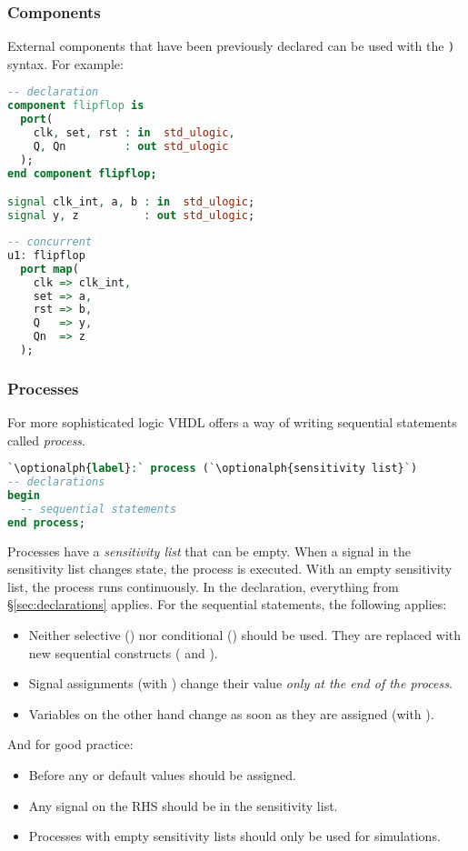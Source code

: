 \subsubsection{Components}
External components that have been previously declared can be used with the
\texttt{)} syntax. For example:
\begin{lstlisting}[language=vhdl]
-- declaration
component flipflop is
  port(
    clk, set, rst : in  std_ulogic,
    Q, Qn         : out std_ulogic 
  );
end component flipflop;

signal clk_int, a, b : in  std_ulogic;
signal y, z          : out std_ulogic;
\end{lstlisting}
\begin{lstlisting}[language=vhdl]
-- concurrent
u1: flipflop
  port map(
    clk => clk_int,
    set => a,
    rst => b,
    Q   => y,
    Qn  => z
  );

\end{lstlisting}

\subsubsection{Processes}
For more sophisticated logic VHDL offers a way of writing sequential statements
called \emph{process}.
\begin{lstlisting}[language=vhdl]
`\optionalph{label}:` process (`\optionalph{sensitivity list}`)
-- declarations
begin
  -- sequential statements
end process;
\end{lstlisting}
Processes have a \emph{sensitivity list} that can be empty.  When a signal in
the sensitivity list changes state, the process is executed.  With an empty
sensitivity list, the process runs continuously.  In the declaration,
everything from \S\ref{sec:declarations} applies. For the sequential
statements, the following applies:
\begin{itemize}
  \item Neither selective () nor conditional () should be used.
    They are replaced with new sequential constructs ( and ).
  \item Signal assignments (with \vhdl{<=}) change their value
    \emph{only at the end of the process}.
  \item Variables on the other hand change as soon as they are assigned (with \vhdl{:=}).
\end{itemize}
And for good practice:
\begin{itemize}
  \item Before any  or  default values should be assigned.
  \item Any signal on the RHS should be in the sensitivity list.
  \item Processes with empty sensitivity lists should only be used for simulations.
\end{itemize}

